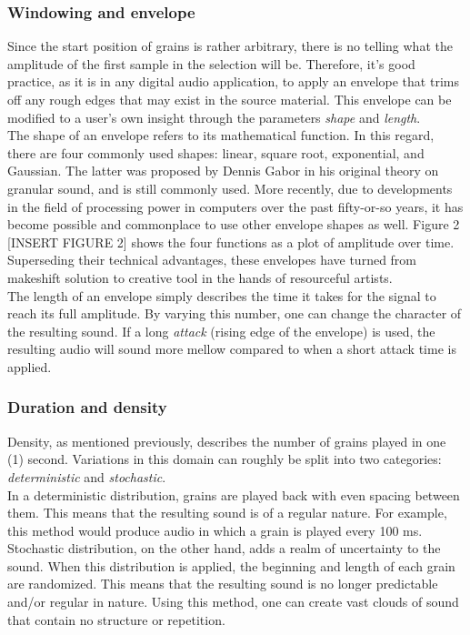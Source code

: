 \documentclass[10pt, twocolumn]{IEEEtran}
\begin{document}
\subsubsection{Windowing and envelope}
Since the start position of grains is rather arbitrary, there is no telling what the amplitude of the first sample in the selection will be. Therefore, it's good practice, as it is in any digital audio application, to apply an envelope that trims off any rough edges that may exist in the source material. This envelope can be modified to a user's own insight through the parameters \textit{shape} and \textit{length}. \\
The shape of an envelope refers to its mathematical function. In this regard, there are four commonly used shapes: linear, square root, exponential, and Gaussian. The latter was proposed by Dennis Gabor in his original theory on granular sound, and is still commonly used. More recently, due to developments in the field of processing power in computers over the past fifty-or-so years, it has become possible and commonplace to use other envelope shapes as well. Figure 2 [INSERT FIGURE 2] shows the four functions as a plot of amplitude over time.
Superseding their technical advantages, these envelopes have turned from makeshift solution to creative tool in the hands of resourceful artists.\\
The length of an envelope simply describes the time it takes for the signal to reach its full amplitude. By varying this number, one can change the character of the resulting sound. If a long \textit{attack} (rising edge of the envelope) is used, the resulting audio will sound more mellow compared to when a short attack time is applied.

\subsubsection{Duration and density}
Density, as mentioned previously, describes the number of grains played in one (1) second. Variations in this domain can roughly be split into two categories: \textit{deterministic} and \textit{stochastic}.\\
In a deterministic distribution, grains are played back with even spacing between them. This means that the resulting sound is of a regular nature. For example, this method would produce audio in which a grain is played every 100 ms. \\
Stochastic distribution, on the other hand, adds a realm of uncertainty to the sound. When this distribution is applied, the beginning and length of each grain are randomized. This means that the resulting sound is no longer predictable and/or regular in nature. Using this method, one can create vast clouds of sound that contain no structure or repetition.
\end{document}
